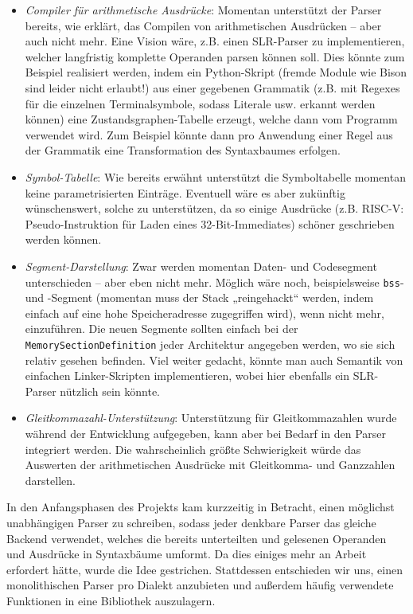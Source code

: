 \begin{itemize} \item \emph{Compiler für arithmetische Ausdrücke}: Momentan
unterstützt der Parser bereits, wie erklärt, das Compilen von arithmetischen
Ausdrücken – aber auch nicht mehr. Eine Vision wäre, z.B. einen SLR-Parser zu
implementieren, welcher langfristig komplette Operanden parsen können soll. Dies
könnte zum Beispiel realisiert werden, indem ein Python-Skript (fremde Module
wie Bison sind leider nicht erlaubt!) aus einer gegebenen Grammatik (z.B. mit
Regexes für die einzelnen Terminalsymbole, sodass Literale usw. erkannt werden
können) eine Zustandsgraphen-Tabelle erzeugt, welche dann vom Programm verwendet
wird. Zum Beispiel könnte dann pro Anwendung einer Regel aus der Grammatik eine
Transformation des Syntaxbaumes erfolgen. \item \emph{Symbol-Tabelle}: Wie
bereits erwähnt unterstützt die Symboltabelle momentan keine parametrisierten
Einträge. Eventuell wäre es aber zukünftig wünschenswert, solche zu
unterstützen, da so einige Ausdrücke (z.B. RISC-V: Pseudo-Instruktion für Laden
eines 32-Bit-Immediates) schöner geschrieben werden können. \item
\emph{Segment-Darstellung}: Zwar werden momentan Daten- und Codesegment
unterschieden – aber eben nicht mehr. Möglich wäre noch, beispielsweise
\texttt{bss}- und -Segment (momentan muss der Stack „reingehackt“
werden, indem einfach auf eine hohe Speicheradresse zugegriffen wird), wenn
nicht mehr, einzuführen. Die neuen Segmente sollten einfach bei der
\texttt{MemorySectionDefinition} jeder Architektur angegeben werden, wo sie sich
relativ gesehen befinden. Viel weiter gedacht, könnte man auch Semantik von
einfachen Linker-Skripten implementieren, wobei hier ebenfalls ein SLR-Parser
nützlich sein könnte. \item \emph{Gleitkommazahl-Unterstützung}: Unterstützung
für Gleitkommazahlen wurde während der Entwicklung aufgegeben, kann aber bei
Bedarf in den Parser integriert werden. Die wahrscheinlich größte Schwierigkeit
würde das Auswerten der arithmetischen Ausdrücke mit Gleitkomma- und Ganzzahlen
darstellen. \end{itemize}

In den Anfangsphasen des Projekts kam kurzzeitig in Betracht, einen möglichst
unabhängigen Parser zu schreiben, sodass jeder denkbare Parser das gleiche
Backend verwendet, welches die bereits unterteilten und gelesenen Operanden und
Ausdrücke in Syntaxbäume umformt. Da dies einiges mehr an Arbeit erfordert
hätte, wurde die Idee gestrichen. Stattdessen entschieden wir uns, einen
monolithischen Parser pro Dialekt anzubieten und außerdem häufig verwendete
Funktionen in eine Bibliothek auszulagern.

